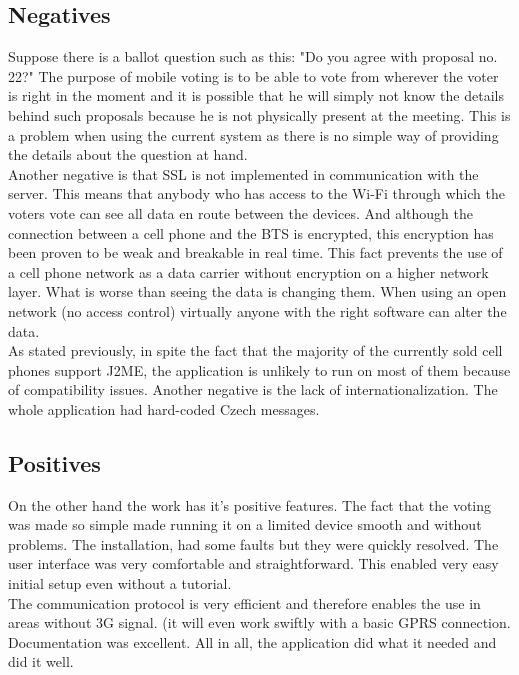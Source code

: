 \documentclass[11pt,twoside,a4paper]{book}
\begin{document}
\subsection{Negatives}
Suppose there is a ballot question such as this: "Do you agree with proposal no. 22?" The purpose of mobile voting is to be able to vote from wherever the voter is right in the moment and it is possible that he will simply not know the details behind such proposals because he is not physically present at the meeting. This is a problem when using the current system as there is no simple way of providing the details about the question at hand.\\
Another negative is that SSL is not implemented in communication with the server. This means that anybody who has access to the Wi-Fi through which the voters vote can see all data en route between the devices. And although the connection between a cell phone and the BTS\cite{whatISBTS}  is encrypted, this encryption has been proven to be weak\cite{GSMCypherWeakness} and breakable in real time. This fact  prevents the use of a cell phone network as a data carrier without encryption on a higher network layer. What is worse than seeing the data is changing them. When using an open network (no access control) virtually anyone with the right software can alter the data.\\
As stated previously, in spite the fact that the majority of the currently sold cell phones support J2ME, the application is unlikely to run on most of them because of compatibility issues.\cite{bakalarkaJV}
Another negative is the lack of internationalization. The whole application had hard-coded Czech messages. 

\subsection{Positives}
On the other hand the work has it's positive features. The fact that the voting was made so simple made running it on a limited device smooth and without problems. The installation, had some faults but they were quickly resolved. The user interface was very comfortable and straightforward. This enabled very easy initial setup even without a tutorial.\\
The communication protocol is very efficient and therefore enables the use in areas without 3G signal. (it will even work swiftly with a basic GPRS connection. Documentation was excellent. All in all, the application did what it needed and did it well.
\end{document}
